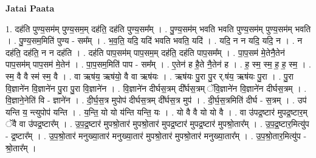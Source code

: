\documentclass[17pt]{extarticle}
\begin{document}
\textbf{Jatai Paata} \newline

1. दह॑ति पुण्य॒सम॑म् पुण्य॒सम॒म् दह॑ति॒ दह॑ति पुण्य॒सम᳚म् । . पु॒ण्य॒सम॑म् भवति भवति पुण्य॒सम॑म् पुण्य॒सम॑म् भवति । . पु॒ण्य॒सम॒मिति॑ पुण्य - सम᳚म् । . भ॒व॒ति॒ यदि॒ यदि॑ भवति भवति॒ यदि॑ । . यदि॒ न न यदि॒ यदि॒ न । . न दह॑ति॒ दह॑ति॒ न न दह॑ति । . दह॑ति पाप॒सम॑म् पाप॒सम॒म् दह॑ति॒ दह॑ति पाप॒सम᳚म् । . पा॒प॒सम॑ मे॒तेनै॒तेन॑ पाप॒सम॑म् पाप॒सम॑ मे॒तेन॑ । . पा॒प॒सम॒मिति॑ पाप - सम᳚म् । . ए॒तेन॑ ह है॒ते नै॒तेन॑ ह । . ह॒ स्म॒ स्म॒ ह॒ ह॒ स्म॒ । . स्म॒ वै वै स्म॑ स्म॒ वै । . वा ऋष॑य॒ ऋष॑यो॒ वै वा ऋष॑यः । . ऋष॑यः पु॒रा पु॒र र्.ष॑य॒ ऋष॑यः पु॒रा । . पु॒रा वि॒ज्ञाने॑न वि॒ज्ञाने॑न पु॒रा पु॒रा वि॒ज्ञाने॑न । . वि॒ज्ञाने॑न दीर्घस॒त्रम् दी᳚र्घस॒त्रम् ॅवि॒ज्ञाने॑न वि॒ज्ञाने॑न दीर्घस॒त्रम् । . वि॒ज्ञाने॒नेति॑ वि - ज्ञाने॑न । . दी॒र्घ॒स॒त्र मुपोप॑ दीर्घस॒त्रम् दी᳚र्घस॒त्र मुप॑ । . दी॒र्घ॒स॒त्रमिति॑ दीर्घ - स॒त्रम् । . उप॑ यन्ति य॒ न्त्युपोप॑ यन्ति । . य॒न्ति॒ यो यो य॑न्ति यन्ति॒ यः । . यो वै वै यो यो वै । . वा उ॑पद्र॒ष्टार॑ मुपद्र॒ष्टार॒म् ॅवै वा उ॑पद्र॒ष्टार᳚म् । . उ॒प॒द्र॒ष्टार॑ मुपश्रो॒तार॑ मुपश्रो॒तार॑ मुपद्र॒ष्टार॑ मुपद्र॒ष्टार॑ मुपश्रो॒तार᳚म् । . उ॒प॒द्र॒ष्टार॒मित्यु॑प - द्र॒ष्टार᳚म् । . उ॒प॒श्रो॒तार॑ मनुख्या॒तार॑ मनुख्या॒तार॑ मुपश्रो॒तार॑ मुपश्रो॒तार॑ मनुख्या॒तार᳚म् । . उ॒प॒श्रो॒तार॒मित्यु॑प - श्रो॒तार᳚म् । \newline
\end{document}
